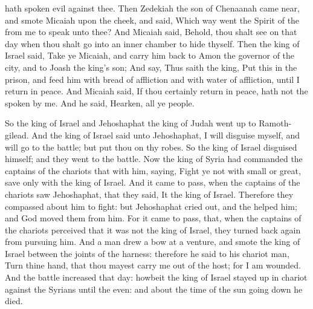 {{} hath
spoken
evil against thee.
Then
Zedekiah the
son of
Chenaanah came
near, and
smote
Micaiah upon the
cheek, and
said,
Which
way
went the
Spirit of the
{} from me to
speak unto thee?
And
Micaiah
said, Behold, thou shalt
see on that
day when thou shalt
go into an
inner
chamber to
hide thyself.
Then the
king of
Israel
said,
Take ye
Micaiah, and carry him
back to
Amon the
governor of the
city, and to
Joash the
king’s
son;
And
say, Thus
saith the
king,
Put this
{} in the
prison, and
feed him with
bread of
affliction and with
water of
affliction, until I
return in
peace.
And
Micaiah
said, If thou
certainly
return in
peace,
{} hath not the
{}
spoken by me. And he
said,
Hearken, all ye
people.
\par }{\PP {}So the
king of
Israel and
Jehoshaphat the
king of
Judah went
up to
Ramoth-gilead.
And the
king of
Israel
said unto
Jehoshaphat, I will
disguise myself, and will
go to the
battle; but
put thou on thy
robes. So the
king of
Israel
disguised himself; and they
went to the
battle.
Now the
king of
Syria had
commanded the
captains of the
chariots that
{} with him,
saying,
Fight ye not with
small or
great, save only with the
king of
Israel.
And it came to pass, when the
captains of the
chariots
saw
Jehoshaphat, that they
said, It
{} the
king of
Israel. Therefore they compassed
about him to
fight: but
Jehoshaphat cried
out, and the
{}
helped him; and
God
moved them
{} from him.
For it came to pass, that, when the
captains of the
chariots
perceived that it was not the
king of
Israel, they turned back
again from
pursuing him.
And a
{} man
drew a
bow at a
venture, and
smote the
king of
Israel between the
joints of the
harness: therefore he
said to his
chariot
man,
Turn thine
hand, that thou mayest carry me
out of the
host; for I am
wounded.
And the
battle
increased that
day: howbeit the
king of
Israel stayed
{}
up in
{}
chariot
against the
Syrians until the
even: and about the
time of the
sun going
down he
died.

}
